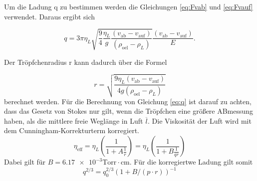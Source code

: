 \noindent Um die Ladung q zu bestimmen werden die Gleichungen \ref{eq:Fvab} und \ref{eq:Fvauf} verwendet.
Daraus ergibt sich

\begin{equation}
    \label{eq:q}
    q = 
    3 \pi \eta_L \sqrt{\frac{9}{4} \frac{\eta_L}{g} \frac{(v_\text{ab} - v_\text{auf})}{(\rho_\text{oel} - \rho_L)}} \frac{(v_\text{ab} - v_\text{auf})}{E}.
\end{equation}

\noindent Der Tröpfchenradius r kann dadurch über die Formel 

\begin{equation}
    \label{eq:r}
    r = \sqrt{\frac{9 \eta_L (v_\text{ab} - v_\text{auf})}{4 g (\rho_\text{oel} - \rho_L)}}
\end{equation}
berechnet werden.
Für die Berechnung von Gleichung \ref{eq:q} ist darauf zu achten, dass das Gesetz von Stokes nur gilt, wenn die Tröpfchen eine größere ABmessung haben, als die 
mittlere freie Weglänge in Luft $\overline{l}$.
Die Viskosität der Luft wird mit dem Cunningham-Korrekturterm korregiert.
\begin{equation}
    \label{eq:nl}
    \eta_\text{eff} = \eta_L (\frac{1}{1 + A \frac{1}{r}}) =  \eta_L (\frac{1}{1 + B \frac{1}{q r}})
\end{equation}
Dabei gilt für $B = \num{6.17 e-3}\text{Torr} \cdot \text{cm} $. 
Für die korregiertwe Ladung gilt somit
\begin{equation}
    \label{eq:qkor}
    q^{2/3} = q_0^{2/3} (1 + B /(p \cdot r))^{-1}
\end{equation}
\cite{sample}
